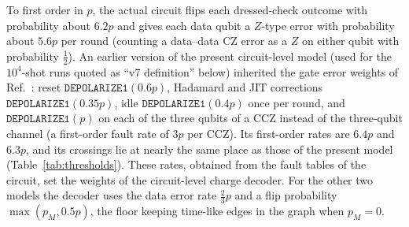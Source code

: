 \documentclass[a4paper]{article}
\begin{document}
To first order in $p$, the actual circuit flips each dressed-check outcome with probability about $6.2p$ and gives each data qubit a $Z$-type error with probability about $5.6p$ per round (counting a data--data CZ error as a $Z$ on either qubit with probability $\tfrac12$).
An earlier version of the present circuit-level model (used for the $10^4$-shot runs quoted as ``v7 definition'' below) inherited the gate error weights of Ref.~\cite{haga2026aqis}: reset $\mathtt{DEPOLARIZE1}(0.6p)$, Hadamard and JIT corrections $\mathtt{DEPOLARIZE1}(0.35p)$, idle $\mathtt{DEPOLARIZE1}(0.4p)$ once per round, and $\mathtt{DEPOLARIZE1}(p)$ on each of the three qubits of a CCZ instead of the three-qubit channel (a first-order fault rate of $3p$ per CCZ). Its first-order rates are $6.4p$ and $6.3p$, and its crossings lie at nearly the same place as those of the present model (Table~\ref{tab:thresholds}). These rates, obtained from the fault tables of the circuit, set the weights of the circuit-level charge decoder. For the other two models the decoder uses the data error rate $\tfrac23p$ and a flip probability $\max(p_M,0.5p)$, the floor keeping time-like edges in the graph when $p_M=0$.
\end{document}

